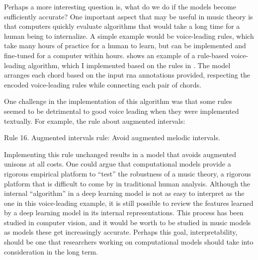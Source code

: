 

Perhaps a more interesting question is, what do we do if the
models become sufficiently accurate? One important aspect
that may be useful in music theory is that computers quickly
evaluate algorithms that would take a long time for a human
being to internalize. A simple example would be
voice-leading rules, which take many hours of practice for a
human to learn, but can be implemented and fine-tuned for a
computer within hours.  shows an
example of a rule-based voice-leading algorithm, which I
implemented based on the rules in
\textcite[p.~10]{huron2016voice}.
The model arranges each chord based on the input \gls{rna}
annotations provided, respecting the encoded voice-leading
rules while connecting each pair of chords. 


One challenge in the implementation of this algorithm was
that some rules seemed to be detrimental to good voice
leading when they were implemented textually. For example,
the rule about augmented intervals:

\begin{italicquotes}
    Rule 16. Augmented intervals rule: Avoid augmented
    melodic intervals.
\end{italicquotes}

Implementing this rule unchanged results in a model that
avoids augmented unisons at all costs. One could argue that
computational models provide a rigorous empirical platform
to ``test'' the robustness of a music theory, a rigorous
platform that is difficult to come by in traditional human
analysis. Although the internal ``algorithm'' in a deep
learning model is not as easy to interpret as the one in
this voice-leading example, it is still possible to review
the features learned by a deep learning model in its
internal representations. This process has been studied in
computer vision, and it would be worth to be studied in
music models as models these get increasingly accurate.
Perhaps this goal, interpretability, should be one that
researchers working on computational models should take into
consideration in the long term.
